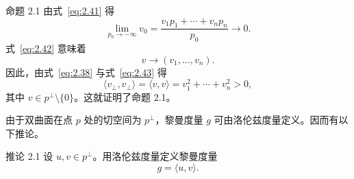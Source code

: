 \begin{statement}{命题 2.1}{}
由式~\eqref{eq:2.41} 得
\begin{equation*}
  \lim_{p_0\to-\infty}v_0=\frac{v_1p_1+\cdots+v_np_n}{p_0}\longrightarrow0.
  \tag{2.42}\label{eq:2.42}
\end{equation*}
式~\eqref{eq:2.42} 意味着
\begin{equation*}
  v\longrightarrow(v_1,\ldots,v_n).
  \tag{2.43}\label{eq:2.43}
\end{equation*}
因此，由式~\eqref{eq:2.38} 与式~\eqref{eq:2.43} 得
\begin{equation*}
  \langle v_\perp,v_\perp\rangle=\langle v,v\rangle=v_1^2+\cdots+v_n^2>0,
  \tag{2.44}\label{eq:2.44}
\end{equation*}
其中 $v\in p^\perp\setminus\{0\}$。这就证明了命题 2.1。
\end{statement}

由于双曲面在点 $p$ 处的切空间为 $p^\perp$，黎曼度量 $g$ 可由洛伦兹度量定义。因而有以下推论。

\begin{statement}{推论 2.1}{}
设 $u,v\in p^\perp$。用洛伦兹度量定义黎曼度量
\begin{equation*}
  g=\langle u,v\rangle.
  \tag{2.45}\label{eq:2.45}
\end{equation*}
\end{statement}
